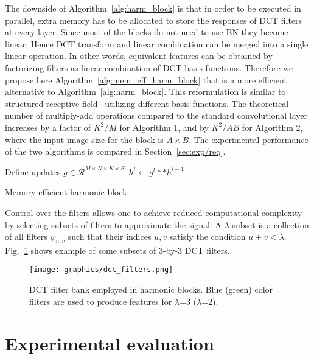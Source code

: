 \documentclass[conference]{IEEEtran}
\begin{document}
The downside of Algorithm~\ref{alg:harm_block} is that in order to be executed in parallel, extra memory has to be allocated to store the responses of DCT filters at every layer. Since most of the blocks do not need to use BN they become linear. Hence DCT transform and linear combination can be merged into a single linear operation. In other words, equivalent features can be obtained by factorizing filters as linear combination of DCT basis functions. Therefore we propose here Algorithm~\ref{alg:mem_eff_harm_block} that is a more efficient alternative to Algorithm~\ref{alg:harm_block}. This reformulation is similar to structured receptive field~\cite{Jacobsen16} utilizing different basis functions. The theoretical number of multiply-add operations compared to the standard convolutional layer increases by a factor of $K^2/M$ for Algorithm 1, and by $K^2/AB$ for Algorithm 2, where the input image size for the block is $A\times B$. The experimental performance of the two algorithms is compared in Section~\ref{sec:exp/req}.

\begin{algorithm}[!h]
 {Define updates} $g \in \mathcal{R}^{M \times N \times K \times K}$\;
 $h^l \leftarrow g^l**h^{l-1}$\;
 \caption{Memory efficient harmonic block} \label{alg:mem_eff_harm_block}
\end{algorithm}

Control over the filters allows one to achieve reduced computational complexity by selecting subsets of filters to approximate the signal. A $\lambda$-subset is a collection of all filters $\psi_{u,v}$ such that their indices $u,v$ satisfy the condition $u+v<\lambda$. Fig.~\ref{fig:filters} shows example of some subsets of 3-by-3 DCT filters.

\begin{figure}[b]
\begin{center}
   \texttt{[image: graphics/dct\_filters.png]}
\end{center}
   \caption{DCT filter bank employed in harmonic blocks. Blue (green) color filters are used to produce features for $\lambda$=3 ($\lambda$=2).}
\label{fig:filters}
\end{figure}

\section{Experimental evaluation} \label{sec:exp}
\end{document}
